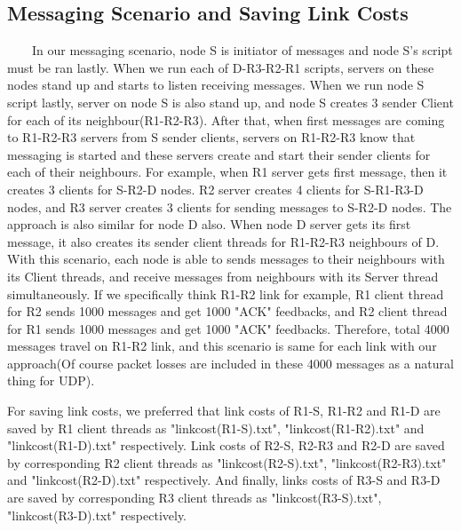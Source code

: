 \documentclass[12pt]{article}
\begin{document}
\subsection{Messaging Scenario and Saving Link Costs}
\ \ \ \ In our messaging scenario, node S is initiator of messages and node S's script must be ran lastly. When we run each of D-R3-R2-R1 scripts, servers on these nodes stand up and starts to listen receiving messages. When we run node S script lastly, server on node S is also stand up, and node S creates 3 sender Client for each of its neighbour(R1-R2-R3). After that, when first messages are coming to R1-R2-R3 servers from S sender clients, servers on R1-R2-R3 know that messaging is started and these servers create and start their sender clients for each of their neighbours. For example, when R1 server gets first message, then it creates 3 clients for S-R2-D nodes. R2 server creates 4 clients for S-R1-R3-D nodes, and R3 server creates 3 clients for sending messages to S-R2-D nodes. The approach is also similar for node D also. When node D server gets its first message, it also creates its sender client threads for R1-R2-R3 neighbours of D. With this scenario, each node is able to sends messages to their neighbours with its Client threads, and receive messages from neighbours with its Server thread simultaneously. If we specifically think R1-R2 link for example, R1 client thread for R2 sends 1000 messages and get 1000 "ACK" feedbacks, and R2 client thread for R1 sends 1000 messages and get 1000 "ACK" feedbacks. Therefore, total 4000 messages travel on R1-R2 link, and this scenario is same for each link with our approach(Of course packet losses are included in these 4000 messages as a natural thing for UDP).

For saving link costs, we preferred that link costs of R1-S, R1-R2 and R1-D are saved by R1 client threads as "link\textunderscore cost(R1-S).txt", "link\textunderscore cost(R1-R2).txt" and "link\textunderscore cost(R1-D).txt" respectively. Link costs of R2-S, R2-R3 and R2-D are saved by corresponding R2 client threads as "link\textunderscore cost(R2-S).txt", "link\textunderscore cost(R2-R3).txt" and "link\textunderscore cost(R2-D).txt" respectively. And finally, links costs of R3-S and R3-D are saved by corresponding R3 client threads as "link\textunderscore cost(R3-S).txt", "link\textunderscore cost(R3-D).txt" respectively.
    
\end{document}
